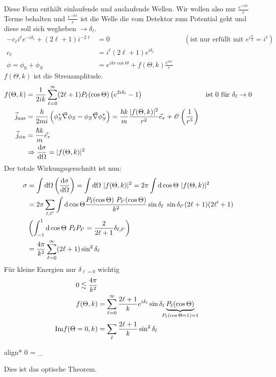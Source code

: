 	Diese Form enthält einlaufende und auslaufende Wellen. Wir wollen also nur $\frac{e^{+ikr}}{r}$ Terme behalten und $\frac{e^{-ikr}}{r}$ ist die Welle die vom Detektor zum Potential geht und diese soll sich wegheben $\rightarrow \delta_\ell$.
		\begin{align*}
			-c_\ell i^\ell e^{-i\delta_\ell} + (2 \ell + 1) i^{-2\ell} &= 0 &
			&(\text{ist nur erfüllt mit } e^{i\frac{\pi}{2}} = i^\ell) \\
			c_\ell &= i^{\ell} (2\ell + 1) e^{i \delta_\ell}\\
			\phi = \phi_0 + \phi_S &= e^{ikr \cos \Theta} + f(\Theta, k) \frac{e^{ikr}}{r}
		\end{align*}
	$f(\Theta,k)$ ist die Streuamplitude.
		\begin{align*}
			f(\Theta,k) &= \frac{1}{2ik} \sum_{\ell = 0}^{\infty} (2 \ell +1) P_\ell (\cos \Theta) 
			\left(e^{2i\delta_\ell} - 1\right) & 
			&\text{ist } 0 \text{ für } \delta_\ell \rightarrow 0 \\
			\vec{j}_{\text{aus}} &= 
			\frac{\hbar}{2mi} \left(\phi_S^* \vec{\nabla} \phi_S
				- \phi_S \vec{\nabla} \phi_S^*
			\right) 
			= \frac{\hbar k}{m} \frac{|f(\Theta, k)|^2}{r^2} \vec{e}_r
			+ \mathscr{O}\left(\frac{1}{r^3}\right) \\
			\vec{j}_{\text{ein}} &= \frac{\hbar k}{m} \vec{e}_r \\
			&\Rightarrow \frac{\mathrm{d} \sigma}{\mathrm{d} \Omega} = |f(\Theta, k)|^2
		\end{align*}
	Der totale Wirkungsqerschnitt ist nun:
		\begin{align*}
			\sigma &= \int \mathrm{d} \Omega \left(\frac{\mathrm{d} \sigma}{\mathrm{d} \Omega}\right)
			= \int \mathrm{d} \Omega ~|f(\Theta, k)|^2 
			= 2 \pi \int \mathrm{d} \cos \Theta ~|f(\Theta, k)|^2 \\
			&= 2 \pi \sum_{\ell, \ell'} \int \mathrm{d} \cos \Theta 
			\frac{P_\ell (\cos \Theta)~P_{\ell'} (\cos \Theta)}{k^2} 
			\sin\delta_\ell ~\sin\delta_{\ell'} (2\ell+1) (2\ell' +1) \\
			&\left(
				\int_{-1}^{1} \mathrm{d} \cos \Theta ~ P_\ell P_{\ell'} = \frac{2}{2 \ell + 1} \delta_{\ell,\ell'}
			\right) \\
			&= \frac{4 \pi}{k^2} \sum_{\ell = 0}^{\infty}
			(2 \ell + 1) \sin^2 \delta_\ell
		\end{align*}
	Für kleine Energien nur $\delta_{\ell=0}$ wichtig
		\begin{align*}
			0 \lesssim \frac{4 \pi}{k^2} \\
			f(\Theta, k) &= \sum_{\ell = 0}^{\infty} \frac{2 \ell + 1}{k} e^{i \delta_\ell}
			\sin \delta_\ell 
			\underbrace{P_\ell (\cos \Theta)}_{\mathclap{P_\ell(\cos \Theta = 1) = 1}} \\
			\mathrm{Im} f(\Theta =0, k) &= \sum_\ell \frac{2 \ell + 1}{k} \sin^2 \delta_\ell
		\end{align*}
		\begin{empheq}[box=\boxed]{align*}
			0 =  
			_{}
		\end{empheq}
	Dies ist das optische Theorem.
	
